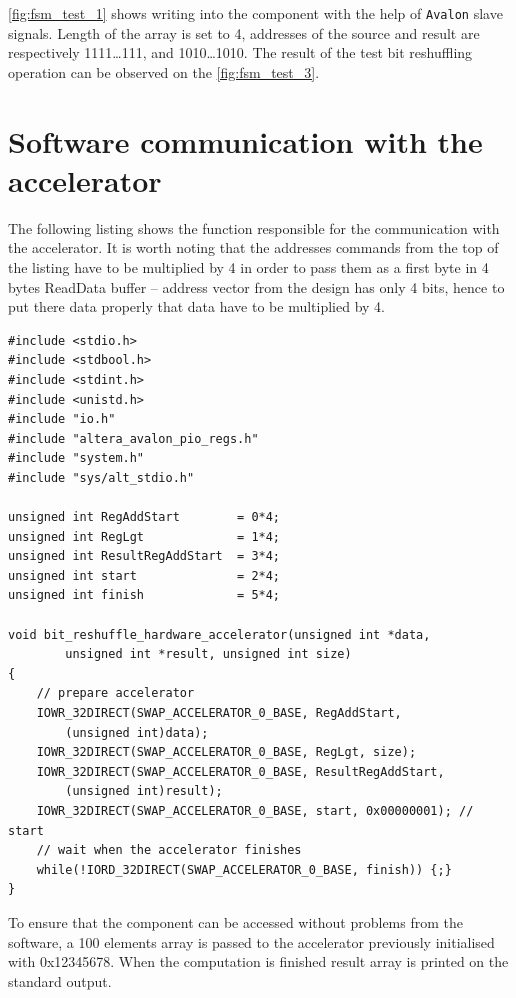 \figurename{} \ref{fig:fsm_test_1} shows writing into the component with the help of \verb|Avalon| slave signals. Length of the array is set to 4, addresses of the source and result are respectively 1111\dots111, and 1010\dots1010. 
The result of the test bit reshuffling operation can be observed on the \figurename{} \ref{fig:fsm_test_3}.

\section{Software communication with the accelerator}
The following listing shows the function responsible for the communication with the accelerator. It is worth noting that the addresses commands from the top of the listing have to be multiplied by 4 in order to pass them as a first byte in 4 bytes ReadData buffer -- address vector from the design has only 4 bits, hence to put there data properly that data have to be multiplied by 4. 
\begin{lstlisting}[style=customc, frame=none]
#include <stdio.h>
#include <stdbool.h>
#include <stdint.h>
#include <unistd.h>
#include "io.h"
#include "altera_avalon_pio_regs.h"
#include "system.h"
#include "sys/alt_stdio.h"

unsigned int RegAddStart        = 0*4;
unsigned int RegLgt             = 1*4;
unsigned int ResultRegAddStart  = 3*4;
unsigned int start              = 2*4;
unsigned int finish             = 5*4;

void bit_reshuffle_hardware_accelerator(unsigned int *data,
        unsigned int *result, unsigned int size)
{
    // prepare accelerator
    IOWR_32DIRECT(SWAP_ACCELERATOR_0_BASE, RegAddStart, 
        (unsigned int)data);
    IOWR_32DIRECT(SWAP_ACCELERATOR_0_BASE, RegLgt, size);
    IOWR_32DIRECT(SWAP_ACCELERATOR_0_BASE, ResultRegAddStart, 
        (unsigned int)result);
    IOWR_32DIRECT(SWAP_ACCELERATOR_0_BASE, start, 0x00000001); // start
    // wait when the accelerator finishes 
    while(!IORD_32DIRECT(SWAP_ACCELERATOR_0_BASE, finish)) {;}
}
\end{lstlisting}
To ensure that the component can be accessed without problems from the software, a 100 elements array is passed to the accelerator previously initialised with 0x12345678. When the computation is finished result array is printed on the standard output. 

